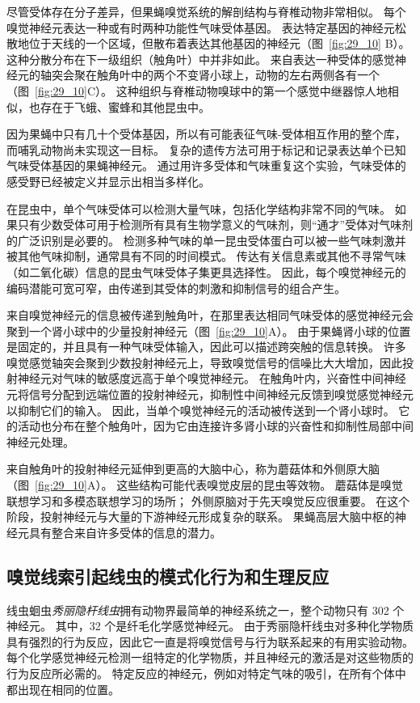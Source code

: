 尽管受体存在分子差异，但果蝇嗅觉系统的解剖结构与脊椎动物非常相似。
每个嗅觉神经元表达一种或有时两种功能性气味受体基因。
表达特定基因的神经元松散地位于天线的一个区域，但散布着表达其他基因的神经元（图~\ref{fig:29_10} B）。
这种分散分布在下一级组织（触角叶）中并非如此。
来自表达一种受体的感觉神经元的轴突会聚在触角叶中的两个不变肾小球上，动物的左右两侧各有一个（图~\ref{fig:29_10}C）。
这种组织与脊椎动物嗅球中的第一个感觉中继器惊人地相似，也存在于飞蛾、蜜蜂和其他昆虫中。


因为果蝇中只有几十个受体基因，所以有可能表征气味-受体相互作用的整个库，而哺乳动物尚未实现这一目标。
复杂的遗传方法可用于标记和记录表达单个已知气味受体基因的果蝇神经元。
通过用许多受体和气味重复这个实验，气味受体的感受野已经被定义并显示出相当多样化。


在昆虫中，单个气味受体可以检测大量气味，包括化学结构非常不同的气味。
如果只有少数受体可用于检测所有具有生物学意义的气味剂，则“通才”受体对气味剂的广泛识别是必要的。
检测多种气味的单一昆虫受体蛋白可以被一些气味刺激并被其他气味抑制，通常具有不同的时间模式。
传达有关信息素或其他不寻常气味（如二氧化碳）信息的昆虫气味受体子集更具选择性。
因此，每个嗅觉神经元的编码潜能可宽可窄，由传递到其受体的刺激和抑制信号的组合产生。


来自嗅觉神经元的信息被传递到触角叶，在那里表达相同气味受体的感觉神经元会聚到一个肾小球中的少量投射神经元（图~\ref{fig:29_10}A）。
由于果蝇肾小球的位置是固定的，并且具有一种气味受体输入，因此可以描述跨突触的信息转换。
许多嗅觉感觉轴突会聚到少数投射神经元上，导致嗅觉信号的信噪比大大增加，因此投射神经元对气味的敏感度远高于单个嗅觉神经元。
在触角叶内，兴奋性中间神经元将信号分配到远端位置的投射神经元，抑制性中间神经元反馈到嗅觉感觉神经元以抑制它们的输入。
因此，当单个嗅觉神经元的活动被传送到一个肾小球时。 它的活动也分布在整个触角叶，因为它由连接许多肾小球的兴奋性和抑制性局部中间神经元处理。


来自触角叶的投射神经元延伸到更高的大脑中心，称为蘑菇体和外侧原大脑（图~\ref{fig:29_10}A）。
这些结构可能代表嗅觉皮层的昆虫等效物。
蘑菇体是嗅觉联想学习和多模态联想学习的场所；
外侧原脑对于先天嗅觉反应很重要。
在这个阶段，投射神经元与大量的下游神经元形成复杂的联系。
果蝇高层大脑中枢的神经元具有整合来自许多受体的信息的潜力。


\subsection{嗅觉线索引起线虫的模式化行为和生理反应}

线虫蛔虫\textit{秀丽隐杆线虫}拥有动物界最简单的神经系统之一，整个动物只有 302 个神经元。
其中，32 个是纤毛化学感觉神经元。
由于秀丽隐杆线虫对多种化学物质具有强烈的行为反应，因此它一直是将嗅觉信号与行为联系起来的有用实验动物。
每个化学感觉神经元检测一组特定的化学物质，并且神经元的激活是对这些物质的行为反应所必需的。
特定反应的神经元，例如对特定气味的吸引，在所有个体中都出现在相同的位置。


